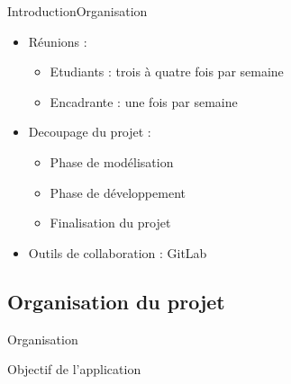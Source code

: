 \documentclass[10pt,handout]{beamer}
\newif\ifplacelogo %
\begin{document}
\begin{frame}{Introduction}{Organisation}
  \begin{itemize}
    \item Réunions :
    \begin{itemize}
      \item Etudiants : trois à quatre fois par semaine
      \item Encadrante : une fois par semaine
    \end{itemize}
    \item Decoupage du projet :
    \begin{itemize}
      \item Phase de modélisation
      \item Phase de développement
      \item Finalisation du projet
    \end{itemize}
    \item Outils de collaboration : GitLab
  \end{itemize}
\end{frame}

\subsection{Organisation du projet}

\begin{frame}{Organisation}

\end{frame}

\placelogofalse
\begin{frame}{Objectif de l'application}
\end{frame}
\placelogotrue
\end{document}

